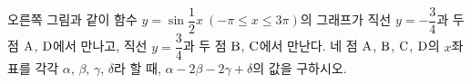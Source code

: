 \noindent\begin{minipage}[t]{0.58\linewidth}\vspace{0pt}\raggedright 오른쪽 그림과 같이 함수 $y=\sin\dfrac{1}{2}x\ (-\pi\le x\le 3\pi)$의 그래프가 직선 $y=-\dfrac{3}{4}$과 두 점 $\mathrm{A}$, $\mathrm{D}$에서 만나고, 직선 $y=\dfrac{3}{4}$과 두 점 $\mathrm{B}$, $\mathrm{C}$에서 만난다. 네 점 $\mathrm{A}$, $\mathrm{B}$, $\mathrm{C}$, $\mathrm{D}$의 $x$좌표를 각각 $\alpha$, $\beta$, $\gamma$, $\delta$라 할 때, $\alpha-2\beta-2\gamma+\delta$의 값을 구하시오. \dmcondfill{$\alpha<\beta<\gamma<\delta$}{}\end{minipage}\hfill\begin{minipage}[t]{0.4\linewidth}\vspace{0pt}\centering \resizebox{\ifdim\width>\linewidth\linewidth\else\width\fi}{!}{}\end{minipage}\par
